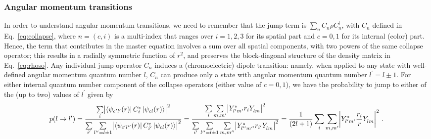 \documentclass[times,sort&compress,final]{elsarticle}
\begin{document}
\subsubsection{Angular momentum transitions}

In order to understand angular momentum transitions, we need to remember that the jump term is 
$\sum_{n} C_n\rho C_n^\dagger$, with $C_n$ defined in Eq.~\eqref{eq:collapse}, where $n=(c,i)$ 
is a multi-index that ranges over $i=1,2,3$ for its spatial part and $c=0,1$ for its internal 
(color) part. 
Hence, the term that contributes in the master equation involves a sum over all spatial components, 
with two powers of the same collapse operator; this results in a radially symmetric function of 
$r^2$, and preserves the block-diagonal structure of the density matrix in Eq.~\eqref{eq:rhoso}. 
Any individual jump operator $C_n$ induces a (chromoelectric) dipole transition: namely, when applied to any state with well-defined angular momentum 
quantum number $l$, $C_n$ can produce only a state with angular momentum quantum number $l^\prime = l\pm 1$.
For either internal quantum number component of the collapse operators (either value of $c=0,1$), 
we have the probability to jump to either of the (up to two) values of $l^\prime$ given by 
\begin{equation}
p(l \to l^\prime) = 
\frac{ \sum\limits_{i} \abs {\bra{ \psi_{c^\prime l^\prime}(r)} C_{i}^c \ket{ \psi_{cl}(r)} }^2 }
{ \sum\limits_{i^\prime} \sum\limits_{l^{\prime\prime}=l \pm 1} \abs {\bra{ \psi_{c^\prime l^{\prime\prime}}(r)} C_{i^\prime}^c \ket{ \psi_{cl}(r)} }^2}
=
\frac{ \sum\limits_{i} \sum\limits_{m,m^\prime} \abs { Y_{l^\prime m^\prime}^\ast r_{i} Y_{l m}^{\phantom{\ast}} }^2 }
{ \sum\limits_{i^\prime} \sum\limits_{l^{\prime\prime}=l \pm 1} \sum\limits_{m,m^{\prime\prime}} \abs {  Y_{l^{\prime\prime} m^{\prime\prime}}^\ast r_{i^\prime} Y_{l m}^{\phantom{\ast}} }^2}
=\frac{1}{(2l+1)} \sum\limits_{i} \sum\limits_{m,m^\prime} \abs { Y_{l^\prime m^\prime}^\ast \frac{r_{i}}{r} Y_{l m}^{\phantom{\ast}} }^2
\,.
\end{equation}
\end{document}
